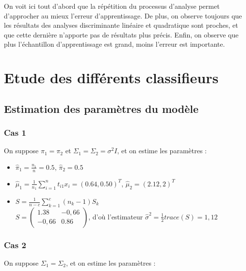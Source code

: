 \documentclass[a4paper,11pt]{article}
\begin{document}
\noindent On voit ici tout d'abord que la répétition du processus d'analyse permet d'approcher au mieux l'erreur d'apprentissage. De plus, on observe toujours que les résultats des analyses discriminante linéaire et quadratique sont proches, et que cette dernière n'apporte pas de résultats plus précis. Enfin, on observe que plus l'échantillon d'apprentissage est grand, moins l'erreur est importante.

\section{Etude des différents classifieurs}

\subsection{Estimation des paramètres du modèle}

\subsubsection{Cas 1}

On suppose $\pi_1 = \pi_2$ et $\Sigma_1 = \Sigma_2 = \sigma^2 I$, et on estime les paramètres :  \\

\begin{itemize}
\item $\hat\pi_1 = \frac{n_1}{n} = 0.5$, $\hat\pi_2 = 0.5$ \\
\item $\hat\mu_1 = \frac{1}{n_1} \displaystyle \sum^{n}_{i=1} t_{i1} x_i = (0.64,0.50)^T$, $\hat\mu_2 = (2.12,2)^T$\\
\item $S = \frac{1}{n-c} \displaystyle \sum^{c}_{k=1} (n_k - 1) S_k$\\
$S = \begin{pmatrix}1.38&-0,66\\-0,66&0.86\end{pmatrix} $, d'où l'estimateur $\hat\sigma^2 = \frac{1}{2}trace(S) = 1,12$

\end{itemize}

\subsubsection{Cas 2}

\noindent On suppose $\Sigma_1 = \Sigma_2$, et on estime les paramètres :  \\
\end{document}
